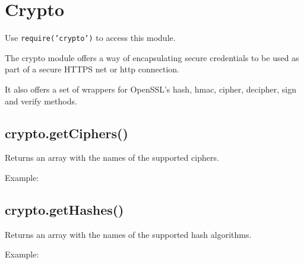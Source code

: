 \section{Crypto}

\begin{Shaded}
\begin{Highlighting}[]
\NormalTok{: } 
\end{Highlighting}
\end{Shaded}

Use \texttt{require('crypto')} to access this module.

The crypto module offers a way of encapsulating secure credentials to be
used as part of a secure HTTPS net or http connection.

It also offers a set of wrappers for OpenSSL's hash, hmac, cipher,
decipher, sign and verify methods.

\subsection{crypto.getCiphers()}

Returns an array with the names of the supported ciphers.

Example:

\begin{Shaded}
\begin{Highlighting}[]
 \NormalTok{();}
\end{Highlighting}
\end{Shaded}

\subsection{crypto.getHashes()}

Returns an array with the names of the supported hash algorithms.

Example:

\begin{Shaded}
\begin{Highlighting}[]
 \NormalTok{();}
\end{Highlighting}
\end{Shaded}

